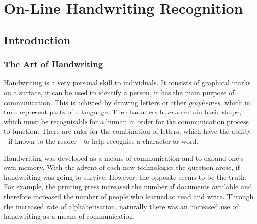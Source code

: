 
\chapter{On-Line Handwriting Recognition}
\label{chap:onlinehwr}


\section{Introduction}
\label{sec:onlinehwrintroduction}


\subsection{The Art of Handwriting}
\label{sec:theartofhandwriting}

Handwriting is a very personal skill to individuals. It consists of graphical
marks on a surface, it can be used to identify a person, it has the main
purpose of communication. This is achivied by drawing letters or other 
\emph{graphemes}, which in turn represent parts of a language.
The characters have a certain basic shape, which must be recognisable
for a human in order for the communication process to function.
There are rules for the combination of letters, which have the ability - if
known to the reader - to help recognise a character or word.

Handwriting was developed as a means of communication and to expand one's own
memory. With the advent of each new technologies the question arose, 
if handwriting was going to survive. However, the opposite seems to be the 
truth: For example, the printing press increased the number of documents
available and therefore increased the number of people who learned to read
and write. Through the increased rate of alphabetisation, naturally there was
an increased use of handwriting as a means of communication.

